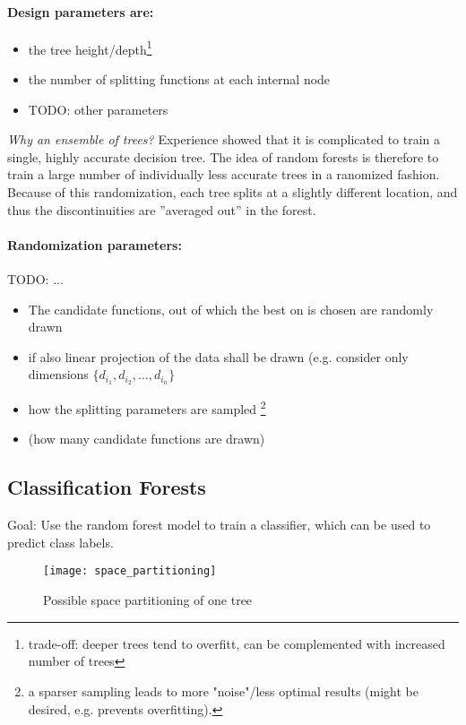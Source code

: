 \paragraph{Design parameters are:}
\begin{itemize}
  \item the tree height/depth\footnote{ trade-off: deeper trees tend to overfitt, can be complemented with increased number of trees}
  \item the number of splitting functions at each internal node
  \item TODO: other parameters
\end{itemize}

\textit{Why an ensemble of trees?} Experience showed that it is complicated to train a single, highly accurate decision tree. The idea of random forests is therefore to train a large number of individually less accurate trees in a ranomized fashion. Because of this randomization, each tree splits at a slightly different location, and thus the discontinuities are ”averaged out” in the forest.

\paragraph{Randomization parameters:} TODO: ...
\begin{itemize}
  \item The candidate functions, out of which the best on is chosen  are randomly drawn
  \item if also linear projection of the data shall be drawn (e.g. consider only dimensions \(\{d_{i_1}, d_{i_2}, \dots, d_{i_n}\}\)
  \item how the splitting parameters are sampled \footnote{a sparser sampling leads to more "noise"/less optimal results (might be desired, e.g. prevents overfitting).}
  \item (how many candidate functions are drawn)
\end{itemize}

\newpage
\subsection*{Classification Forests}
Goal: Use the random forest model to train a classifier, which can be used to predict class labels.

\begin{figure}[H]
  \centering
  \texttt{[image: space\_partitioning]}
  \caption{Possible space partitioning of one tree}
\end{figure}

